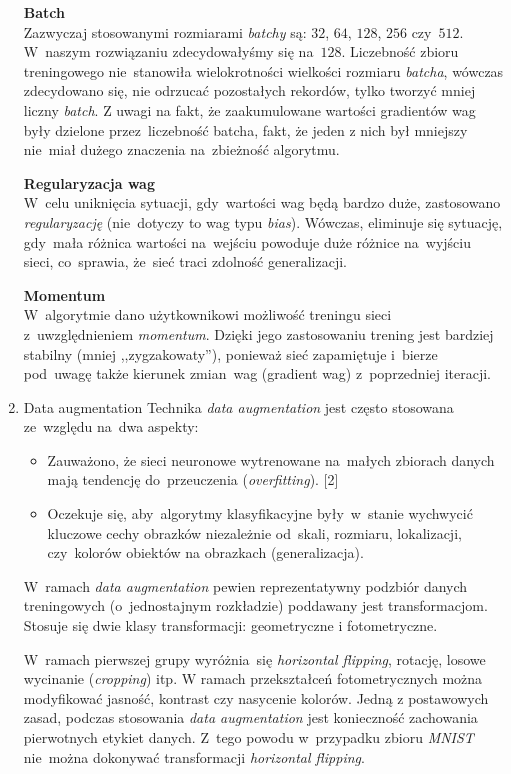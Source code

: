 \documentclass[11pt, a4paper]{article}
\begin{document}
\begin{enumerate}
\textbf{Batch}\\
Zazwyczaj stosowanymi rozmiarami \textit{batchy} są: $32$, $64$, $128$, $256$ czy~$512$. W~naszym rozwiązaniu zdecydowałyśmy się na~$128$. Liczebność zbioru treningowego nie~stanowiła wielokrotności
wielkości rozmiaru \textit{batcha}, wówczas zdecydowano się, nie odrzucać pozostałych rekordów, tylko tworzyć mniej liczny \textit{batch}. Z uwagi na fakt, że zaakumulowane wartości gradientów wag były dzielone
przez~liczebność batcha, fakt, że jeden z nich był mniejszy nie~miał dużego znaczenia na~zbieżność algorytmu. 

\textbf{Regularyzacja wag}\\
W~celu uniknięcia sytuacji, gdy~wartości wag będą bardzo duże, zastosowano \textit{regularyzację} (nie~dotyczy to wag typu \textit{bias}). Wówczas, eliminuje się sytuację, gdy~mała różnica wartości na~wejściu powoduje duże różnice na~wyjściu sieci, co~sprawia, że~sieć traci zdolność generalizacji.

\textbf{Momentum}\\
W~algorytmie dano użytkownikowi możliwość treningu sieci z~uwzględnieniem \textit{momentum}.
Dzięki jego zastosowaniu trening jest bardziej stabilny (mniej ,,zygzakowaty''), ponieważ sieć zapamiętuje i~bierze pod~uwagę także kierunek zmian~wag (gradient wag) z~poprzedniej iteracji.

\item Data augmentation\newline
Technika \textit{data augmentation} jest często stosowana ze~względu na~dwa aspekty:
\begin{itemize}
 \item Zauważono, że sieci neuronowe wytrenowane na~małych zbiorach danych mają tendencję do~przeuczenia (\textit{overfitting}). [2] 
 \item Oczekuje się, aby~algorytmy klasyfikacyjne były~w~stanie wychwycić kluczowe cechy obrazków niezależnie od~skali, rozmiaru, lokalizacji, czy~kolorów obiektów na obrazkach (generalizacja).
\end{itemize}

W~ramach \textit{data augmentation} pewien reprezentatywny podzbiór danych treningowych (o~jednostajnym rozkładzie) poddawany jest transformacjom.
Stosuje się dwie klasy transformacji: geometryczne i fotometryczne.

W~ramach pierwszej grupy wyróżnia~się \textit{horizontal flipping},
rotację, losowe wycinanie (\textit{cropping}) itp. W ramach przekształceń fotometrycznych można modyfikować jasność, kontrast czy nasycenie kolorów.
Jedną z postawowych zasad, podczas stosowania \textit{data augmentation} jest konieczność zachowania pierwotnych etykiet danych.
Z~tego powodu w~przypadku zbioru \textit{MNIST} nie~można dokonywać transformacji \textit{horizontal flipping}.


\end{enumerate}
\end{document}
